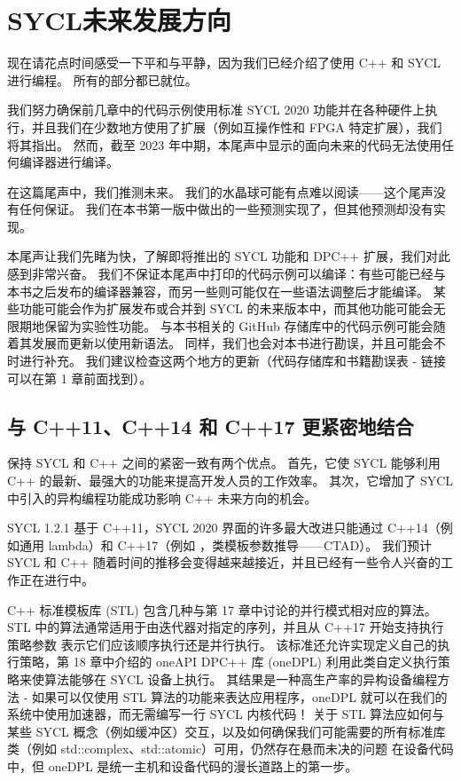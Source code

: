 \section{SYCL未来发展方向}
现在请花点时间感受一下平和与平静，因为我们已经介绍了使用 C++ 和 SYCL 进行编程。 所有的部分都已就位。

我们努力确保前几章中的代码示例使用标准 SYCL 2020 功能并在各种硬件上执行，并且我们在少数地方使用了扩展（例如互操作性和 FPGA 特定扩展），我们将其指出。 然而，截至 2023 年中期，本尾声中显示的面向未来的代码无法使用任何编译器进行编译。

在这篇尾声中，我们推测未来。 我们的水晶球可能有点难以阅读——这个尾声没有任何保证。 我们在本书第一版中做出的一些预测实现了，但其他预测却没有实现。

本尾声让我们先睹为快，了解即将推出的 SYCL 功能和 DPC++ 扩展，我们对此感到非常兴奋。 我们不保证本尾声中打印的代码示例可以编译：有些可能已经与本书之后发布的编译器兼容，而另一些则可能仅在一些语法调整后才能编译。 某些功能可能会作为扩展发布或合并到 SYCL 的未来版本中，而其他功能可能会无限期地保留为实验性功能。 与本书相关的 GitHub 存储库中的代码示例可能会随着其发展而更新以使用新语法。 同样，我们也会对本书进行勘误，并且可能会不时进行补充。 我们建议检查这两个地方的更新（代码存储库和书籍勘误表 - 链接可以在第 1 章前面找到）。

\subsection{与 C++11、C++14 和 C++17 更紧密地结合}
保持 SYCL 和 C++ 之间的紧密一致有两个优点。 首先，它使 SYCL 能够利用 C++ 的最新、最强大的功能来提高开发人员的工作效率。 其次，它增加了 SYCL 中引入的异构编程功能成功影响 C++ 未来方向的机会。

SYCL 1.2.1 基于 C++11，SYCL 2020 界面的许多最大改进只能通过 C++14（例如通用 lambda）和 C++17（例如 ，类模板参数推导——CTAD）。 我们预计 SYCL 和 C++ 随着时间的推移会变得越来越接近，并且已经有一些令人兴奋的工作正在进行中。

C++ 标准模板库 (STL) 包含几种与第 17 章中讨论的并行模式相对应的算法。STL 中的算法通常适用于由迭代器对指定的序列，并且从 C++17 开始支持执行策略参数 表示它们应该顺序执行还是并行执行。 该标准还允许实现定义自己的执行策略，第 18 章中介绍的 oneAPI DPC++ 库 (oneDPL) 利用此类自定义执行策略来使算法能够在 SYCL 设备上执行。 其结果是一种高生产率的异构设备编程方法 - 如果可以仅使用 STL 算法的功能来表达应用程序，oneDPL 就可以在我们的系统中使用加速器，而无需编写一行 SYCL 内核代码！ 关于 STL 算法应如何与某些 SYCL 概念（例如缓冲区）交互，以及如何确保我们可能需要的所有标准库类（例如 std::complex、std::atomic）可用，仍然存在悬而未决的问题 在设备代码中，但 oneDPL 是统一主机和设备代码的漫长道路上的第一步。

